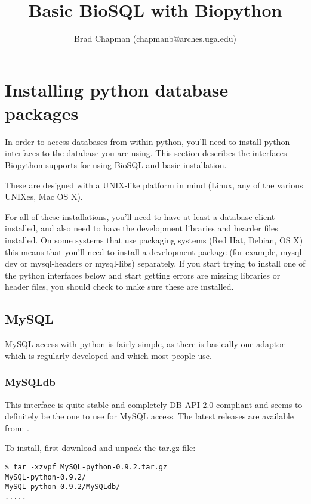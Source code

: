 \documentclass{article}
\begin{document}
\title{Basic BioSQL with Biopython}
\author{Brad Chapman (chapmanb@arches.uga.edu)}

\maketitle

\section{Installing python database packages}

In order to access databases from within python, you'll need to install
python interfaces to the database you are using. This section describes
the interfaces Biopython supports for using BioSQL and basic
installation.

These are designed with a UNIX-like platform in mind (Linux, any of the
various UNIXes, Mac OS X).

For all of these installations, you'll need to have at least a database
client installed, and also need to have the development libraries and
hearder files installed. On some systems that use packaging systems
(Red Hat, Debian, OS X) this means that you'll need to install a
development package (for example, mysql-dev or mysql-headers or 
mysql-libs) separately. If you start trying to install one of the python
interfaces below and start getting errors are missing libraries or
header files, you should check to make sure these are installed.

\subsection{MySQL}

MySQL access with python is fairly simple, as there is basically one
adaptor which is regularly developed and which most people use.

\subsubsection{MySQLdb}

This interface is quite stable and completely DB API-2.0 compliant and
seems to definitely be the one to use for MySQL access. The latest
releases are available from: 
.


To install, first download and unpack the tar.gz file:

\begin{verbatim}
$ tar -xzvpf MySQL-python-0.9.2.tar.gz 
MySQL-python-0.9.2/
MySQL-python-0.9.2/MySQLdb/
.....
\end{verbatim}
\end{document}
